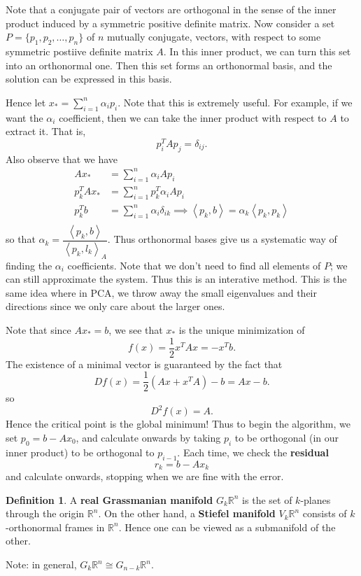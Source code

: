 \documentclass[12pt,letterpaper,boxed]{maths_v5}
\newcommand{\rr}{\mathbb{R}}
\theoremstyle{definition}
\newtheorem{definition}{Definition}[section]
\begin{document}
    Note that a conjugate pair of vectors are orthogonal in the sense of the 
    inner product induced by a  symmetric positive definite matrix. 
    Now consider a set $P = \{p_1, p_2, \dots, p_n\}$ of $n$ mutually conjugate, 
    vectors, with respect to some 
    symmetric postiive definite matrix $A$.
    In this inner product, we can turn this set into an orthonormal one.
    Then this set forms an orthonormal basis, and the solution can be expressed 
    in this basis. 

    Hence let $x_* = \sum_{i = 1}^{n}\alpha_ip_i$. Note that this is extremely 
    useful. For example, if we want the $\alpha_i$ coefficient, then 
    we can take the inner product with respect to $A$ to extract it. That is, 
    \[
        p_i^TAp_j = \delta_{ij}.
    \]
    Also observe that we have
    \begin{align*}
        Ax_* &= \sum_{i = 1}^{n}\alpha_iAp_i\\
        p_k^TAx_* &= \sum_{i = 1}^{n}p_k^T\alpha_iAp_i\\
        p_k^Tb &= \sum_{i = 1}^{n}\alpha_i\delta_{ik}
        \implies \left<p_k, b\right> = \alpha_k\left<p_k, p_k  \right>\\
    \end{align*}
    so that $\alpha_k = \dfrac{\left< p_k, b \right>}{\left<p_k, l_k \right>_A}$.
    Thus orthonormal bases give us a systematic way of finding the $\alpha_i$ coefficients. 
    Note that we don't need to find all elements of $P$; we can still approximate the 
    system. Thus this is an interative method. This is the same idea where in PCA, we throw away the small eigenvalues and their directions 
    since we only care about the larger ones. 

    Note that since $Ax_* = b$, we see that $x_*$ is the unique minimization of 
    \[
        f(x) = \frac{1}{2}x^TAx = - x^Tb. 
    \]
    The existence of a minimal vector is guaranteed by the fact that 
    \[
        Df(x) = \frac{1}{2}(Ax + x^TA) - b = Ax - b.
    \]
    so 
    \[
        D^2f(x) = A. 
    \]
    Hence the critical point is the global minimum! Thus to begin the algorithm, we 
    set $p_0 = b - Ax_0$, and calculate onwards by taking $p_i$ to be orthogonal (in our 
    inner product) to be orthogonal to $p_{i-1}$. Each time, we check the \textbf{residual}
    \[
        r_k = b - Ax_k
    \]
    and calculate onwards, stopping when we are fine with the error.

    \begin{definition}
        A \textbf{real Grassmanian manifold} $G_k\rr^n$ is the set of $k$-planes 
        through the origin $\rr^n$.  
        On the other hand, a \textbf{Stiefel manifold} $V_{k}\rr^n$ consists of $k$-orthonormal frames in $\rr^n$. 
        Hence one can be viewed as a submanifold of the other. 
    \end{definition}
    Note: in general, $G_k\rr^n \cong G_{n-k}\rr^n$. 
\end{document}
